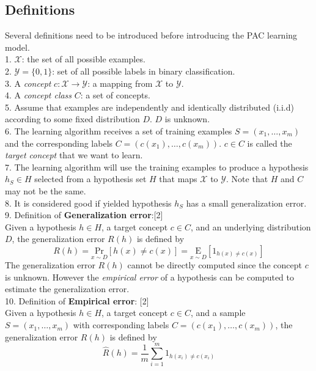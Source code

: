 \documentclass[12pt]{article}
\theoremstyle{definition}
\theoremstyle{remark}
\numberwithin{equation}{section}
\begin{document}
\subsection{Definitions}
Several definitions need to be introduced before introducing the PAC learning model. \\[0.2cm]
1. $\mathcal{X}$: the set of all possible examples.\\[0.2cm]
2. $\mathcal{Y} = \{0,1\}$: set of all possible labels in binary classification. \\[0.2cm]
3. A \emph{concept} \(c: \mathcal{X} \rightarrow \mathcal{Y}\): a mapping from \(\mathcal{X}\) to \(\mathcal{Y}\). \\[0.2cm]
4. A \emph{concept class} $C$: a set of concepts.  \\[0.2cm]
5. Assume that examples are independently and identically distributed (i.i.d) according to some fixed distribution $D$. $D$ is unknown. \\[0.2cm]
6. The learning algorithm receives a set of training examples $S = (x_1, \dots , x_m)$ and the corresponding labels $C=(c(x_1), \dots, c(x_m))$. $c \in C$ is called the \emph{target concept} that we want to learn. \\[0.2cm]
7. The learning algorithm will use the training examples to produce a hypothesis $h_S \in H$ selected from a hypothesis set $H$ that maps $\mathcal{X}$ to $\mathcal{Y}$. Note that $H$ and $C$ may not be the same.\\[0.2cm]
8. It is considered good if yielded hypothesis $h_S$ has a small generalization error. \\[0.2cm]
9. Definition of \textbf{Generalization error}:[2] \\[0.2cm]
Given a hypothesis $h \in H$, a target concept $c \in C$, and an underlying distribution $D$, the generalization error $R(h)$ is defined by
\[R(h)= \underset{x\sim D}{\text{Pr}}[h(x)\neq c(x)]= \underset{x \sim D}{\text{E}}[1_{h(x) \neq c(x)}]\]
The generalization error $R(h)$ cannot be directly computed since the concept $c$ is unknown. However the \emph{empirical error} of a hypothesis can be computed to estimate the generalization error. \\[0.2cm]
10. Definition of \textbf{Empirical error}: [2] \\[0.2cm]
Given a hypothesis $h \in H$, a target concept $c \in C$, and a sample $S = (x_1,\dots,x_m)$ with corresponding labels $C = (c(x_1),\dots,c(x_m))$, the generalization error $R(h)$ is defined by
\[\widehat{R}(h)= \frac{1}{m}\sum_{i=1}^{m}1_{h(x_i) \neq c(x_i)}\]
\end{document}
